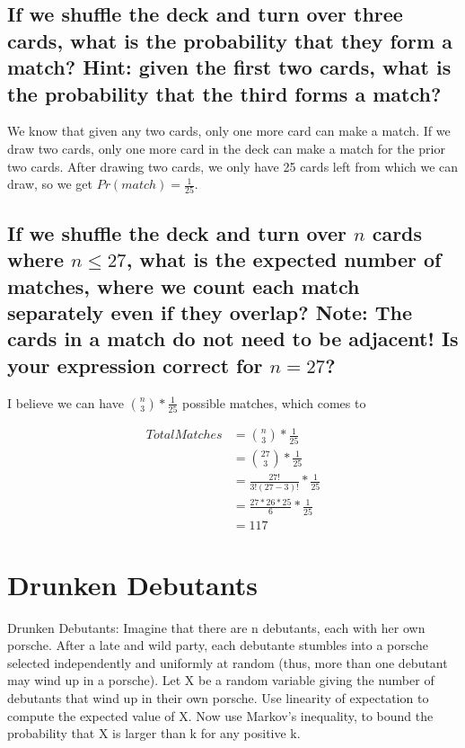 \documentclass[titlepage]{article}\usepackage[]{graphicx}\usepackage[]{color}
\begin{document}
\subsection{ If we shuffle the deck and turn over three cards, what is the
probability that they form a match? Hint: given the first two
cards, what is the probability that the third forms a match?}

We know that given any two cards, only one more card can make a match. If we
draw two cards, only one more card in the deck can make a match for the prior
two cards. After drawing two cards, we only have 25 cards left from which we
can draw, so we get $Pr(match) = \frac{1}{25}$. 

\subsection{ If we shuffle the deck and turn over $n$ cards where $n \leq 27$, what
is the expected number of matches, where we count each match
separately even if they overlap? Note: The cards in a match do
not need to be adjacent! Is your expression correct for $n = 27$?}

I believe we can have ${n \choose 3} * \frac{1}{25}$ possible matches, which
comes to 

\begin{align*}
	Total Matches &={n \choose 3} * \frac{1}{25} \\
              &= {27 \choose 3}   * \frac{1}{25} \\
              &=   \frac{27!}{3!(27-3)!} * \frac{1}{25} \\
				&= \frac{27 * 26 * 25}{6} * \frac{1}{25}  \\
				&= 117
\end{align*}



  \section{ Drunken Debutants}
Drunken Debutants: Imagine that there are n debutants, each with her own
porsche. After a late and wild party, each debutante stumbles into a porsche
selected independently and uniformly at random (thus, more than one debutant
may wind up in a porsche). Let X be a random variable giving the number of
debutants that wind up in their own porsche. Use linearity of expectation to
compute the expected value of X. Now use Markov’s inequality, to bound the
probability that X is larger than k for any positive k.
\end{document}
